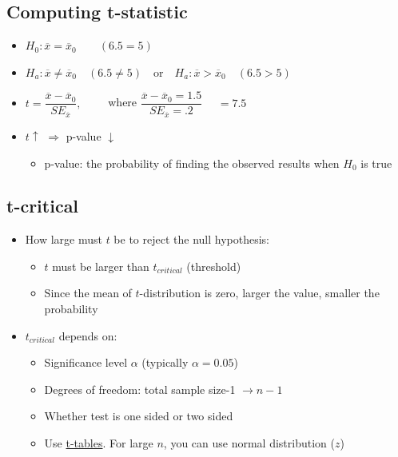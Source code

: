 \documentclass[10pt,article]{article}
\begin{document}
\subsection{Computing t-statistic}
\label{sec:orged0ab46}
\begin{itemize}
\item \(H_0: \overline{x} = \overline{x}_0 \qquad (6.5 = 5)\)
\item \( H_a: \overline{x} \ne \overline{x}_0 \quad (6.5 \ne 5) \quad
  \text{or} \quad H_a: \overline{x}>\overline{x}_0 \quad (6.5 > 5) \)

\item \(t=\dfrac{\overline{x} - \overline{x}_0}{SE_{\overline{x}}}, \qquad\)
 where \(\dfrac{\overline{x} - \overline{x}_0 = 1.5}{SE_{\overline{x}} = .2} \)  \(  \quad = 7.5 \)
\end{itemize}

\begin{itemize}
\item \(t \uparrow\) \(\Rightarrow\)  p-value \( \downarrow \)

\begin{itemize}
\item p-value: the probability of finding the observed results when \(H_{0}\) is true
\end{itemize}
\end{itemize}

\subsection{t-critical}
\label{sec:org05c30d3}
\begin{itemize}
\item How large must \(t\) be to reject the null hypothesis:
\begin{itemize}
\item \(t\) must be larger than \(t_{critical}\) (threshold)
\item Since the mean of \(t\)-distribution is zero, larger the value, smaller
the probability
\end{itemize}
\end{itemize}

\begin{itemize}
\item \(t_{critical}\) depends on:
\begin{itemize}
\item Significance level \(\alpha\) (typically \(\alpha=0.05\))
\item Degrees of freedom: total sample size-1 \(\rightarrow n-1\)
\item Whether test is one sided or two sided
\item Use \uline{t-tables}. For large \(n\), you can use normal distribution (\(z\))
\end{itemize}
\end{itemize}
\end{document}
